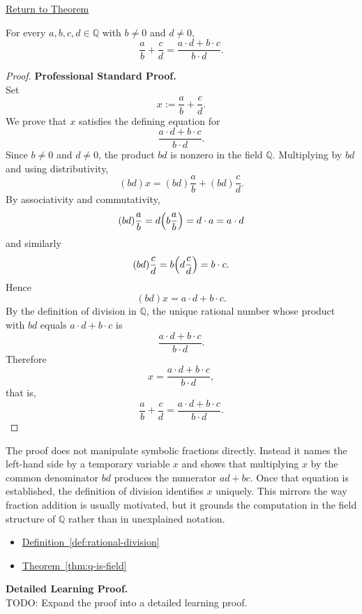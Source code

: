 \newpage
{}
\label{prf:rational-fraction-addition}

\begin{remark*}[Return]
\hyperref[thm:rational-fraction-addition]{Return to Theorem}
\end{remark*}

\begin{theorem*}
For every $a,b,c,d\in\mathbb{Q}$ with $b\neq 0$ and $d\neq 0$,
\[
\frac{a}{b}+\frac{c}{d}
=
\frac{a\cdot d+b\cdot c}{b\cdot d}.
\]
\end{theorem*}

\begin{proof}
\textbf{Professional Standard Proof.}~\\
Set
\[
x:=\frac{a}{b}+\frac{c}{d}.
\]
We prove that $x$ satisfies the defining equation for
\[
\frac{a\cdot d+b\cdot c}{b\cdot d}.
\]
Since $b\neq 0$ and $d\neq 0$, the product $bd$ is nonzero in the field
$\mathbb{Q}$.  Multiplying by $bd$ and using distributivity,
\[
(bd)x=(bd)\frac{a}{b}+(bd)\frac{c}{d}.
\]
By associativity and commutativity,
\[
(bd)\frac{a}{b}=d\Bigl(b\frac{a}{b}\Bigr)=d\cdot a=a\cdot d
\]
and similarly
\[
(bd)\frac{c}{d}=b\Bigl(d\frac{c}{d}\Bigr)=b\cdot c.
\]
Hence
\[
(bd)x=a\cdot d+b\cdot c.
\]
By the definition of division in $\mathbb{Q}$, the unique rational number
whose product with $bd$ equals $a\cdot d+b\cdot c$ is
\[
\frac{a\cdot d+b\cdot c}{b\cdot d}.
\]
Therefore
\[
x=\frac{a\cdot d+b\cdot c}{b\cdot d},
\]
that is,
\[
\frac{a}{b}+\frac{c}{d}
=
\frac{a\cdot d+b\cdot c}{b\cdot d}.
\]
\end{proof}

\begin{remark*}
The proof does not manipulate symbolic fractions directly.  Instead it names
the left-hand side by a temporary variable $x$ and shows that multiplying $x$
by the common denominator $bd$ produces the numerator $ad+bc$.  Once that
equation is established, the definition of division identifies $x$ uniquely.
This mirrors the way fraction addition is usually motivated, but it grounds
the computation in the field structure of $\mathbb{Q}$ rather than in
unexplained notation.
\end{remark*}

\begin{dependencies}
\begin{itemize}
  \item \hyperref[def:rational-division]{Definition~\ref*{def:rational-division}}
  \item \hyperref[thm:q-is-field]{Theorem~\ref*{thm:q-is-field}}
\end{itemize}
\end{dependencies}

\textbf{Detailed Learning Proof.}~\\
TODO: Expand the proof into a detailed learning proof.

